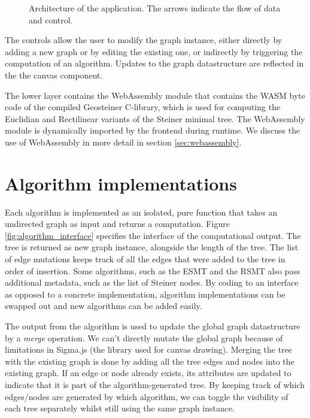 \documentclass{l4proj}
\begin{document}
\begin{figure}[h]
      \centering
      
      \caption{Architecture of the application. The arrows indicate the flow of data and control.}
      \label{fig:architecture}
\end{figure}

The controls allow the user to modify the graph instance, either directly by adding a new graph or by editing the existing one, or indirectly by triggering the computation of an algorithm.
Updates to the graph datastructure are reflected in the the canvas component.

The lower layer contains the WebAssembly module that contains the WASM byte code of the compiled Geosteiner C-library, which is used for computing the Euclidian and Rectilinear variants of the Steiner minimal tree. The WebAssembly module is dynamically imported by the frontend during runtime.
We discuss the use of WebAssembly in more detail in section \ref{sec:webassembly}.

\section{Algorithm implementations}

\begin{wrapstuff}[r,width=0.3\textwidth,type=figure]
      \centering
      \caption{Interface of the algorithm computational output.}
      
      \label{fig:algorithm_interface}
\end{wrapstuff}
Each algorithm is implemented as an isolated, pure function that takes an undirected graph as input and returns a computation.
Figure \ref{fig:algorithm_interface} specifies the interface of the computational output. The tree is returned as new graph instance, alongside the length of the tree. The list of edge mutations keeps track of all the edges that were added to the tree in order of insertion. Some algorithms, such as the ESMT and the RSMT also pass additional metadata, such as the list of Steiner nodes.
By coding to an interface as opposed to a concrete implementation, algorithm implementations can be swapped out and new algorithms can be added easily.

The output from the algorithm is used to update the global graph datastructure by a \textit{merge} operation. We can't directly mutate the global graph because of limitations in Sigma.js (the library used for canvas drawing).
Merging the tree with the existing graph is done by adding all the tree edges and nodes into the existing graph. If an edge or node already exists, its attributes are updated to indicate that it is part of the algorithm-generated tree. By keeping track of which edges/nodes are generated by which algorithm, we can toggle the visibility of each tree separately whilst still using the same graph instance.
\end{document}
